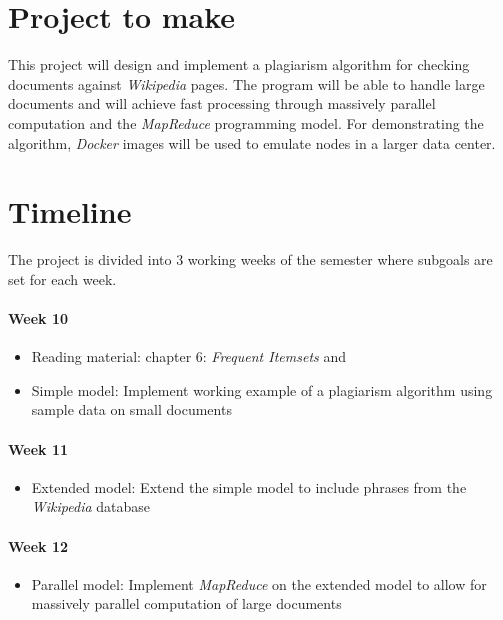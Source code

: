 \section{Project to make}
This project will design and implement a plagiarism algorithm for checking documents against \emph{Wikipedia} pages. The program will be able to handle large documents and will achieve fast processing through massively parallel computation and the \emph{MapReduce} programming model. For demonstrating the algorithm, \emph{Docker} images will be used to emulate nodes in a larger data center.


\section{Timeline}
The project is divided into 3 working weeks of the semester where subgoals are set for each week.

\paragraph{Week 10}
\begin{itemize}
    \item Reading material: \cite{leskovec2014mining} chapter 6: \emph{Frequent Itemsets} and \cite{huang2008similarity}
    \item Simple model: Implement working example of a plagiarism algorithm using sample data on small documents
\end{itemize}

\paragraph{Week 11}
\begin{itemize}
    \item Extended model: Extend the simple model to include phrases from the \emph{Wikipedia} database
\end{itemize}

\paragraph{Week 12}
\begin{itemize}
    \item Parallel model: Implement \emph{MapReduce} on the extended model to allow for massively parallel computation of large documents
\end{itemize}


